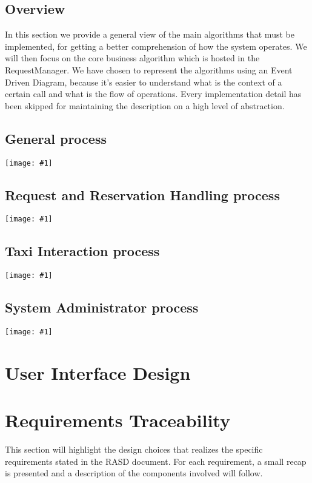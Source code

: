\documentclass[11pt, a4paper,titlepage]{article}
\newcommand{\image}[1]{
	\begin{center}
		\noindent \texttt{[image: \#1]}
	\end{center}
	}
\begin{document}
	\subsection{Overview}
	In this section we provide a general view of the main algorithms that must be implemented, for getting a better comprehension of how the system operates.
	We will then focus on the core business algorithm which is hosted in the RequestManager.
	We have chosen to represent the algorithms using an Event Driven Diagram, because it's easier to understand what is the context of a certain call and what is the flow of operations. Every implementation detail has been skipped for maintaining the description on a high level of abstraction.
	\newpage
	\subsection{General process}
	\image{edp_general.png}
	\newpage
	\subsection{Request and Reservation Handling process}
		\image{edp_request.png}
	\newpage
	\subsection{Taxi Interaction process}
		\image{edp_taxi.png}
	\newpage
	\subsection{System Administrator process}
		\image{edp_admin.png}
		\newpage
\section{User Interface Design}
\section{Requirements Traceability}
	This section will highlight the design choices that realizes the specific requirements stated in the RASD document. For each requirement, a small recap is presented and a description of the components involved will follow.
\end{document}
